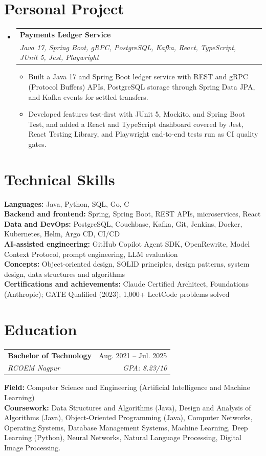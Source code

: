\documentclass[a4paper,11pt]{article}
\makeatletter
\newcommand{\entry}[4]{\item\begin{tabularx}{\textwidth}{@{}Xr@{}}\textbf{#1}& #2\\\textit{\small #3}&\textit{\small #4}\end{tabularx}\vspace{-5pt}}
\newcommand{\bulletpoint}[1]{\item\small{#1}}
\makeatother
\begin{document}
\section{Personal Project}
\begin{itemize}[leftmargin=0in,label={}]
  \entry{Payments Ledger Service}{}{Java 17, Spring Boot, gRPC, PostgreSQL, Kafka, React, TypeScript, JUnit 5, Jest, Playwright}{}
  \begin{itemize}
    \bulletpoint{Built a Java 17 and Spring Boot ledger service with REST and gRPC (Protocol Buf{}fers) APIs, PostgreSQL storage through Spring Data JPA, and Kafka events for settled transfers.}
    \bulletpoint{Developed features test-f{}irst with JUnit 5, Mockito, and Spring Boot Test, and added a React and TypeScript dashboard covered by Jest, React Testing Library, and Playwright end-to-end tests run as CI quality gates.}
  \end{itemize}
\end{itemize}

\section{Technical Skills}
\small\textbf{Languages:} Java, Python, SQL, Go, C \\
\textbf{Backend and frontend:} Spring, Spring Boot, REST APIs, microservices, React \\
\textbf{Data and DevOps:} PostgreSQL, Couchbase, Kafka, Git, Jenkins, Docker, Kubernetes, Helm, Argo CD, CI/CD \\
\textbf{AI-assisted engineering:} GitHub Copilot Agent SDK, OpenRewrite, Model Context Protocol, prompt engineering, LLM evaluation \\
\textbf{Concepts:} Object-oriented design, SOLID principles, design patterns, system design, data structures and algorithms \\
\textbf{Certif{}ications and achievements:} Claude Certif{}ied Architect, Foundations (Anthropic); GATE Qualif{}ied (2023); 1,000+ LeetCode problems solved

\section{Education}
\begin{tabularx}{\textwidth}{@{}Xr@{}}
  \textbf{Bachelor of Technology} & Aug. 2021 -- Jul. 2025 \\
  \textit{\small RCOEM Nagpur} & \textit{\small GPA: 8.23/10} \\
\end{tabularx}
\small\textbf{Field:} Computer Science and Engineering (Artif{}icial Intelligence and Machine Learning)\\
\small\textbf{Coursework:} Data Structures and Algorithms (Java), Design and Analysis of Algorithms (Java), Object-Oriented Programming (Java), Computer Networks, Operating Systems, Database Management Systems, Machine Learning, Deep Learning (Python), Neural Networks, Natural Language Processing, Digital Image Processing.
\end{document}
